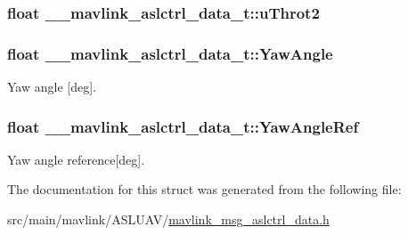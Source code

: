 \hypertarget{struct____mavlink__aslctrl__data__t_a341bac576c8354e77d177d78c4b32f9e}{
\subsubsection[{u\+Throt2}]{\setlength{\rightskip}{0pt plus 5cm}float \+\_\+\+\_\+mavlink\+\_\+aslctrl\+\_\+data\+\_\+t\+::u\+Throt2}}\label{struct____mavlink__aslctrl__data__t_a341bac576c8354e77d177d78c4b32f9e}
\hypertarget{struct____mavlink__aslctrl__data__t_a1ba87fc3d1977253edc450cadfb19959}{
\subsubsection[{Yaw\+Angle}]{\setlength{\rightskip}{0pt plus 5cm}float \+\_\+\+\_\+mavlink\+\_\+aslctrl\+\_\+data\+\_\+t\+::\+Yaw\+Angle}}\label{struct____mavlink__aslctrl__data__t_a1ba87fc3d1977253edc450cadfb19959}


Yaw angle \mbox{[}deg\mbox{]}. 

\hypertarget{struct____mavlink__aslctrl__data__t_a2a8330900c135e9421488b59e1956d4e}{
\subsubsection[{Yaw\+Angle\+Ref}]{\setlength{\rightskip}{0pt plus 5cm}float \+\_\+\+\_\+mavlink\+\_\+aslctrl\+\_\+data\+\_\+t\+::\+Yaw\+Angle\+Ref}}\label{struct____mavlink__aslctrl__data__t_a2a8330900c135e9421488b59e1956d4e}


Yaw angle reference\mbox{[}deg\mbox{]}. 



The documentation for this struct was generated from the following file\+:\begin{DoxyCompactItemize}
\item 
src/main/mavlink/\+A\+S\+L\+U\+A\+V/\hyperlink{mavlink__msg__aslctrl__data_8h}{mavlink\+\_\+msg\+\_\+aslctrl\+\_\+data.\+h}\end{DoxyCompactItemize}
